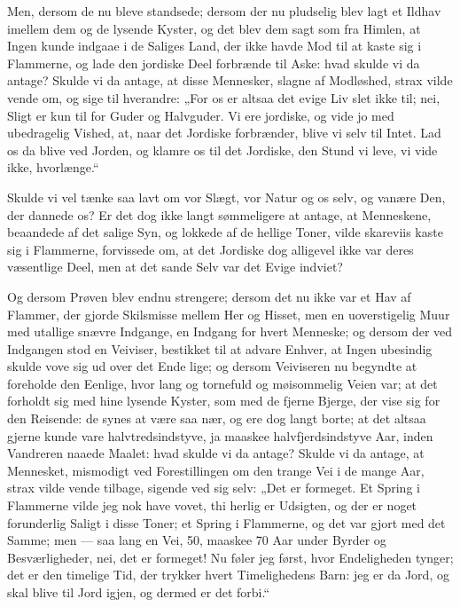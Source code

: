 \documentclass[12pt,a4paper]{book}
\newcommand{\apage}[1]{\marginnote{\footnotesize\textit{[#1]}}}
\begin{document}
Men, dersom de nu bleve standsede; dersom der nu pludselig blev lagt et Ildhav imellem dem og de lysende Kyster, og det blev dem sagt som fra Himlen, at Ingen kunde indgaae i de Saliges Land, der ikke havde Mod til at kaste sig i Flammerne, og lade den jordiske Deel forbrænde til Aske: hvad skulde vi da antage? Skulde vi da antage, at disse Mennesker, slagne af Modløshed, strax vilde vende om, og sige til hverandre: „For os er altsaa det evige Liv slet ikke til; nei, Sligt er kun til for Guder og Halvguder. Vi ere jordiske, og vide jo med ubedragelig Vished, at, naar det Jordiske forbrænder, blive vi selv til Intet. Lad os da blive ved Jorden, og klamre os til det Jordiske, den Stund vi leve, vi vide ikke, hvorlænge.“

Skulde vi vel tænke saa lavt om vor Slægt, vor Natur og os selv, og vanære Den, der dannede os? Er det dog ikke langt sømmeligere at antage, at Menneskene, beaandede af det salige Syn, og lokkede af de hellige Toner, vilde skareviis kaste sig i Flammerne, forvissede om, at det Jordiske dog alligevel ikke var deres væsentlige Deel, men at det sande Selv var det Evige indviet?

Og dersom Prøven blev endnu strengere; dersom det nu ikke var et Hav af Flammer, der gjorde Skilsmisse mellem Her og Hisset, men en uoverstigelig Muur med utallige snævre Indgange, en Indgang for hvert Menneske; og dersom der ved Indgangen stod en Veiviser, bestikket til at advare Enhver, at Ingen ubesindig skulde vove sig ud over det Ende\-%
lige; \apage{6} og dersom Veiviseren nu begyndte at foreholde den Eenlige, hvor lang og tornefuld og møisommelig Veien var; at det forholdt sig med hine lysende Kyster, som med de fjerne Bjerge, der vise sig for den Reisende: de synes at være saa nær, og ere dog langt borte; at det altsaa gjerne kunde vare halvtredsindstyve, ja maaskee halvfjerdsindstyve Aar, inden Vandreren naaede Maalet: hvad skulde vi da antage? Skulde vi da antage, at Mennesket, mismodigt ved Forestillingen om den trange Vei i de mange Aar, strax vilde vende tilbage, sigende ved sig selv: „Det er formeget. Et Spring i Flammerne vilde jeg nok have vovet, thi herlig er Udsigten, og der er noget forunderlig Saligt i disse Toner; et Spring i Flammerne, og det var gjort med det Samme; men --- saa lang en Vei, 50, maaskee 70 Aar under Byrder og Besværligheder, nei, det er formeget! Nu føler jeg først, hvor Endeligheden tynger; det er den timelige Tid, der trykker hvert Timelighedens Barn: jeg er da Jord, og skal blive til Jord igjen, og dermed er det forbi.“
\end{document}

